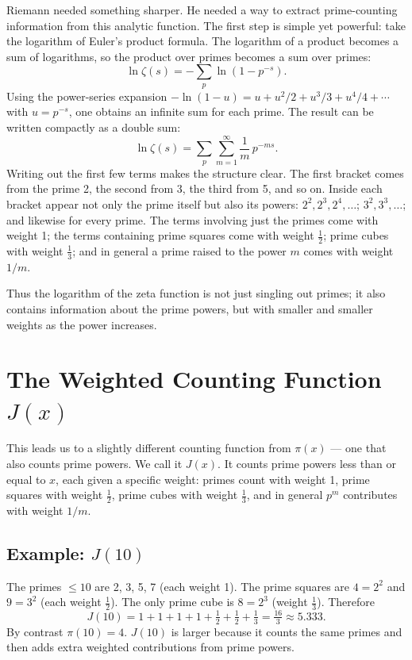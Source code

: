 \documentclass[11pt]{article}
\begin{document}
Riemann needed something sharper. He needed a way to extract prime-counting information from this analytic function. The first step is simple yet powerful: take the logarithm of Euler's product formula. The logarithm of a product becomes a sum of logarithms, so the product over primes becomes a sum over primes:
\[
\ln \zeta(s) = -\sum_{p} \ln\left(1 - p^{-s}\right).
\]
Using the power-series expansion $-\ln(1-u) = u + u^2/2 + u^3/3 + u^4/4 + \cdots$ with $u = p^{-s}$, one obtains an infinite sum for each prime. The result can be written compactly as a double sum:
\[
\ln \zeta(s) = \sum_{p} \sum_{m=1}^{\infty} \frac{1}{m}\, p^{-ms}.
\]
Writing out the first few terms makes the structure clear. The first bracket comes from the prime 2, the second from 3, the third from 5, and so on. Inside each bracket appear not only the prime itself but also its powers: $2^2, 2^3, 2^4, \ldots$; $3^2, 3^3, \ldots$; and likewise for every prime. The terms involving just the primes come with weight 1; the terms containing prime squares come with weight $\tfrac{1}{2}$; prime cubes with weight $\tfrac{1}{3}$; and in general a prime raised to the power $m$ comes with weight $1/m$.

Thus the logarithm of the zeta function is not just singling out primes; it also contains information about the prime powers, but with smaller and smaller weights as the power increases.

\section{The Weighted Counting Function $J(x)$}

This leads us to a slightly different counting function from $\pi(x)$ --- one that also counts prime powers. We call it $J(x)$. It counts prime powers less than or equal to $x$, each given a specific weight: primes count with weight 1, prime squares with weight $\tfrac{1}{2}$, prime cubes with weight $\tfrac{1}{3}$, and in general $p^m$ contributes with weight $1/m$.

\subsection*{Example: $J(10)$}

The primes $\le 10$ are 2, 3, 5, 7 (each weight 1). The prime squares are $4 = 2^2$ and $9 = 3^2$ (each weight $\tfrac{1}{2}$). The only prime cube is $8 = 2^3$ (weight $\tfrac{1}{3}$). Therefore
\[
J(10) = 1+1+1+1 + \tfrac{1}{2}+\tfrac{1}{2} + \tfrac{1}{3} = \tfrac{16}{3} \approx 5.333.
\]
By contrast $\pi(10) = 4$. $J(10)$ is larger because it counts the same primes and then adds extra weighted contributions from prime powers.
\end{document}
